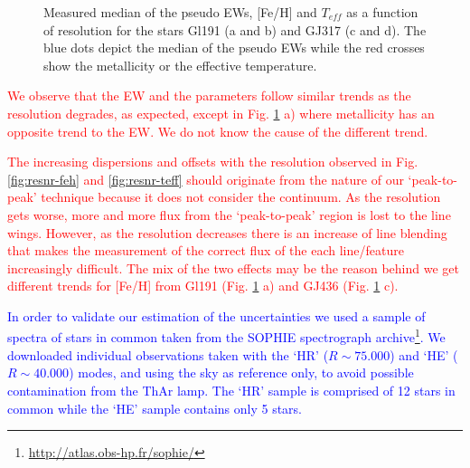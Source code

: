 \documentclass{aa}
\begin{document}
\begin{figure}[htb]
\caption{Measured median of the pseudo EWs, [Fe/H] and $T_{eff}$ as a function of resolution for the stars Gl191 (a and b) and GJ317 (c and d). The blue dots depict the median of the pseudo EWs while the red crosses show the metallicity or the effective temperature.}
\label{fig:ewres}
\end{figure}

\textcolor{red}{We observe that the EW and the parameters follow similar trends as the resolution degrades, as expected, except in Fig. \ref{fig:ewres} a) where metallicity has an opposite trend to the EW. We do not know the cause of the different trend.}

\textcolor{red}{The increasing dispersions and offsets with the resolution observed in Fig. \ref{fig:resnr-feh} and \ref{fig:resnr-teff} should originate from the nature of our `peak-to-peak' technique because it does not consider the continuum. As the resolution gets worse, more and more flux from the `peak-to-peak' region is lost to the line wings. However, as the resolution decreases there is an increase of line blending that makes the measurement of the correct flux of the each line/feature increasingly difficult. The mix of the two effects may be the reason behind we get different trends for [Fe/H] from Gl191 (Fig. \ref{fig:ewres} a) and GJ436 (Fig. \ref{fig:ewres} c).}



\textcolor{blue}{In order to validate our estimation of the uncertainties we used a sample of spectra of stars in common taken from the SOPHIE spectrograph \citep{Bouchy-2006} archive\footnote{\url{http://atlas.obs-hp.fr/sophie/}}. We downloaded individual observations taken with the `HR' ($R\sim75.000$) and `HE' ($R\sim40.000$) modes, and using the sky as reference only, to avoid possible contamination from the ThAr lamp. The `HR' sample is comprised of 12 stars in common while the `HE' sample contains only 5 stars.} 
\end{document}
